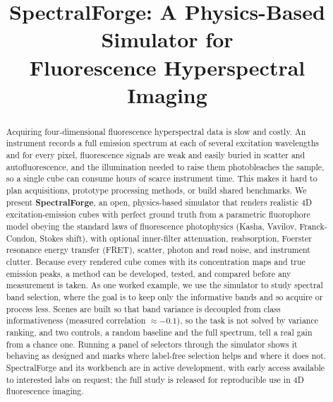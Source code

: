 \documentclass[conference]{IEEEtran}
\begin{document}
\title{\LARGE SpectralForge: A Physics-Based Simulator for\\ Fluorescence Hyperspectral Imaging}

\author{
}

\maketitle

\begin{abstract}
Acquiring four-dimensional fluorescence hyperspectral data is slow and costly. An
instrument records a full emission spectrum at each of several excitation wavelengths and
for every pixel, fluorescence signals are weak and easily buried in scatter and
autofluorescence, and the illumination needed to raise them photobleaches the sample, so a
single cube can consume hours of scarce instrument time. This makes it hard to plan
acquisitions, prototype processing methods, or build shared benchmarks. We present
\textbf{SpectralForge}, an open, physics-based simulator that renders realistic 4D
excitation-emission cubes with perfect ground truth from a parametric fluorophore model
obeying the standard laws of fluorescence photophysics (Kasha, Vavilov, Franck-Condon,
Stokes shift), with optional inner-filter attenuation, reabsorption, Foerster resonance
energy transfer (FRET), scatter, photon and read noise, and instrument clutter. Because
every rendered cube comes with its concentration maps and true emission peaks, a method can
be developed, tested, and compared before any measurement is taken. As one worked
example, we use the simulator to study spectral band selection, where the goal is to keep
only the informative bands and so acquire or process less. Scenes are built so that band
variance is decoupled from class informativeness (measured correlation $\approx -0.1$), so the
task is not solved by variance ranking, and two controls, a random baseline and the full
spectrum, tell a real gain from a chance one. Running a panel of selectors through the
simulator shows it behaving as designed and marks where label-free selection helps and
where it does not. SpectralForge and its workbench are in active development, with early
access available to interested labs on request; the full study is released for reproducible
use in 4D fluorescence imaging.
\end{abstract}
\end{document}
